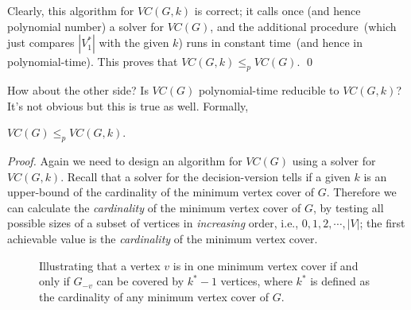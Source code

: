 Clearly, this algorithm for $VC(G, k)$ is correct; it calls once (and hence polynomial number)
a solver for $VC(G)$, and the additional procedure~(which just compares $|V_1^*|$ with the given $k$)
runs in constant time~(and hence in polynomial-time). This proves that $VC(G, k)\le_p VC(G)$. \qed

How about the other side? Is $VC(G)$ polynomial-time reducible to $VC(G, k)$? It's not obvious but 
this is true as well. Formally,
\begin{fact}
$VC(G)\le_p VC(G, k)$.
\end{fact}
\emph{Proof.}  Again we need to design an algorithm for $VC(G)$ using a solver for $VC(G, k)$.
Recall that a solver for the decision-version tells if a given $k$ is an upper-bound of the
cardinality of the minimum vertex cover of $G$. 
Therefore we can calculate the \emph{cardinality} of the minimum vertex cover of $G$,
by testing all possible sizes of a subset of vertices in \emph{increasing} order,
   i.e., $0, 1, 2, \cdots, |V|$;
the first achievable value is the \emph{cardinality} of the minimum vertex cover.

\begin{algorithmblock}[0.8\textwidth]
	\xxx
	\xxx
	\xxx
	\xxx
\end{algorithmblock}

\begin{figure}[!b]
\centering{}
\caption{Illustrating that a vertex $v$ is in one minimum vertex cover if and only if
$G_{-v}$ can be covered by $k^* - 1$ vertices, where $k^*$ is defined as the cardinality of any minimum vertex cover of $G$.}
\label{fig:vertex-cover}
\end{figure}



